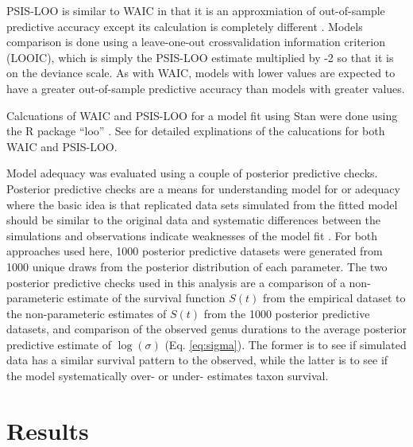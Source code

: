 \documentclass{article}
\begin{document}
PSIS-LOO is similar to WAIC in that it is an approxmiation of out-of-sample predictive accuracy except its calculation is completely different \citep{Vehtari2015,Vehtari2015a}. Models comparison is done using a leave-one-out crossvalidation information criterion (LOOIC), which is simply the PSIS-LOO estimate multiplied by -2 so that it is on the deviance scale. As with WAIC, models with lower values are expected to have a greater out-of-sample predictive accuracy than models with greater values.

Calcuations of WAIC and PSIS-LOO for a model fit using Stan were done using the R package ``loo'' \citep{loo}. See \citet{Vehtari2015a} for detailed explinations of the calucations for both WAIC and PSIS-LOO.

Model adequacy was evaluated using a couple of posterior predictive checks. Posterior predictive checks are a means for understanding model for or adequacy where the basic idea is that replicated data sets simulated from the fitted model should be similar to the original data and systematic differences between the simulations and observations indicate weaknesses of the model fit \citep{Gelman2013d}. For both approaches used here, 1000 posterior predictive datasets were generated from 1000 unique draws from the posterior distribution of each parameter. The two posterior predictive checks used in this analysis are a comparison of a non-parameteric estimate of the survival function \(S(t)\) from the empirical dataset to the non-parameteric estimates of \(S(t)\) from the 1000 posterior predictive datasets, and comparison of the observed genus durations to the average posterior predictive estimate of \(\log(\sigma)\) (Eq. \ref{eq:sigma}). The former is to see if simulated data has a similar survival pattern to the observed, while the latter is to see if the model systematically over- or under- estimates taxon survival.



\section{Results}
\end{document}
